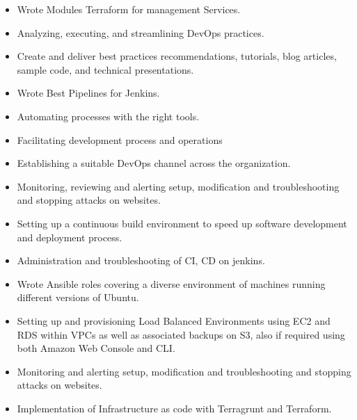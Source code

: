 \divider

\begin{itemize}
  \item Wrote Modules Terraform for management Services.
  \item Analyzing, executing, and streamlining DevOps practices.
  \item Create and deliver best practices recommendations, tutorials, blog articles, sample code, and technical presentations.
  \item Wrote Best Pipelines for Jenkins.
  \item Automating processes with the right tools.
  \item Facilitating development process and operations
  \item Establishing a suitable DevOps channel across the organization.
  \item Monitoring, reviewing and alerting setup, modification and troubleshooting and stopping attacks on websites.
  \item Setting up a continuous build environment to speed up software development and deployment process.
  \item Administration and troubleshooting of CI, CD on jenkins.
\end{itemize}

\divider

\begin{itemize}
  \item Wrote Ansible roles covering a diverse environment of machines running different versions of Ubuntu.
  \item Setting up and provisioning Load Balanced Environments using EC2 and RDS within VPCs as well as associated backups on S3, also if required using both Amazon Web Console and CLI.
  \item Monitoring and alerting setup, modification and troubleshooting and stopping attacks on websites.
  \item Implementation of Infrastructure as code with Terragrunt and Terraform.
\end{itemize}

\divider

